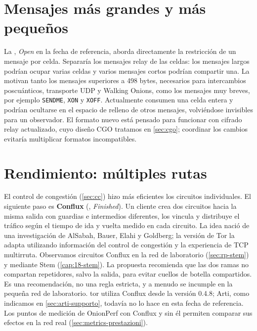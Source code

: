 \section{Mensajes más grandes y más pequeños}\label{sec:fut-340}

La , \emph{Open} en la fecha de referencia, aborda directamente la restricción de un mensaje por celda. Separaría los mensajes relay de las celdas: los mensajes largos podrían ocupar varias celdas y varios mensajes cortos podrían compartir una. La motivan tanto los mensajes superiores a 498 bytes, necesarios para intercambios poscuánticos, transporte UDP y Walking Onions, como los mensajes muy breves, por ejemplo \texttt{SENDME}, \texttt{XON} y \texttt{XOFF}. Actualmente consumen una celda entera y podrían ocultarse en el espacio de relleno de otros mensajes, volviéndose invisibles para un observador. El formato nuevo está pensado para funcionar con cifrado relay actualizado, cuyo diseño CGO tratamos en \cref{sec:cgo}; coordinar los cambios evitaría multiplicar formatos incompatibles.

\section{Rendimiento: múltiples rutas}\label{sec:fut-conflux}

El control de congestión (\cref{sec:cc}) hizo más eficientes los circuitos individuales. El siguiente paso es \textbf{Conflux} (, \emph{Finished}). Un cliente crea dos circuitos hacia la misma salida con guardias e intermedios diferentes, los vincula y distribuye el tráfico según el tiempo de ida y vuelta medido en cada circuito. La idea nació de una investigación de AlSabah, Bauer, Elahi y Goldberg; la versión de Tor la adapta utilizando información del control de congestión y la experiencia de TCP multirruta. Observamos circuitos Conflux en la red de laboratorio (\cref{sec:rp-stem}) y mediante Stem (\cref{cap:18-stem}). La propuesta recomienda que las dos ramas no compartan repetidores, salvo la salida, para evitar cuellos de botella compartidos. Es una recomendación, no una regla estricta, y a menudo se incumple en la pequeña red de laboratorio. tor utiliza Conflux desde la versión 0.4.8; Arti, como indicamos en \cref{sec:arti-supporto}, todavía no lo hace en esta fecha de referencia. Los puntos de medición de OnionPerf con Conflux y sin él permiten comparar sus efectos en la red real (\cref{sec:metrics-prestazioni}).

